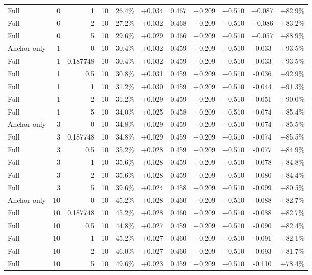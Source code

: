 \begin{table}[htbp]
\begin{tabular}{lrrrccccccc}
Full & 0 & 1 & 10 & 26.4\% & +0.034 & 0.467 & +0.209 & +0.510 & +0.087 & +82.9\% \\
Full & 0 & 2 & 10 & 27.2\% & +0.032 & 0.468 & +0.209 & +0.510 & +0.086 & +83.2\% \\
Full & 0 & 5 & 10 & 29.6\% & +0.029 & 0.466 & +0.209 & +0.510 & +0.057 & +88.9\% \\
Anchor only & 1 & 0 & 10 & 30.4\% & +0.032 & 0.459 & +0.209 & +0.510 & -0.033 & +93.5\% \\
Full & 1 & 0.187748 & 10 & 30.4\% & +0.032 & 0.459 & +0.209 & +0.510 & -0.033 & +93.5\% \\
Full & 1 & 0.5 & 10 & 30.8\% & +0.031 & 0.459 & +0.209 & +0.510 & -0.036 & +92.9\% \\
Full & 1 & 1 & 10 & 31.2\% & +0.030 & 0.459 & +0.209 & +0.510 & -0.044 & +91.3\% \\
Full & 1 & 2 & 10 & 31.2\% & +0.029 & 0.459 & +0.209 & +0.510 & -0.051 & +90.0\% \\
Full & 1 & 5 & 10 & 34.0\% & +0.025 & 0.458 & +0.209 & +0.510 & -0.074 & +85.4\% \\
Anchor only & 3 & 0 & 10 & 34.8\% & +0.029 & 0.459 & +0.209 & +0.510 & -0.074 & +85.5\% \\
Full & 3 & 0.187748 & 10 & 34.8\% & +0.029 & 0.459 & +0.209 & +0.510 & -0.074 & +85.5\% \\
Full & 3 & 0.5 & 10 & 35.2\% & +0.028 & 0.459 & +0.209 & +0.510 & -0.077 & +84.9\% \\
Full & 3 & 1 & 10 & 35.6\% & +0.028 & 0.459 & +0.209 & +0.510 & -0.078 & +84.8\% \\
Full & 3 & 2 & 10 & 35.6\% & +0.028 & 0.459 & +0.209 & +0.510 & -0.080 & +84.4\% \\
Full & 3 & 5 & 10 & 39.6\% & +0.024 & 0.458 & +0.209 & +0.510 & -0.099 & +80.5\% \\
Anchor only & 10 & 0 & 10 & 45.2\% & +0.028 & 0.460 & +0.209 & +0.510 & -0.088 & +82.7\% \\
Full & 10 & 0.187748 & 10 & 45.2\% & +0.028 & 0.460 & +0.209 & +0.510 & -0.088 & +82.7\% \\
Full & 10 & 0.5 & 10 & 44.8\% & +0.027 & 0.459 & +0.209 & +0.510 & -0.090 & +82.4\% \\
Full & 10 & 1 & 10 & 45.2\% & +0.027 & 0.460 & +0.209 & +0.510 & -0.091 & +82.1\% \\
Full & 10 & 2 & 10 & 46.0\% & +0.027 & 0.460 & +0.209 & +0.510 & -0.093 & +81.7\% \\
Full & 10 & 5 & 10 & 49.6\% & +0.023 & 0.459 & +0.209 & +0.510 & -0.110 & +78.4\% \\

\end{tabular}
\end{table}
